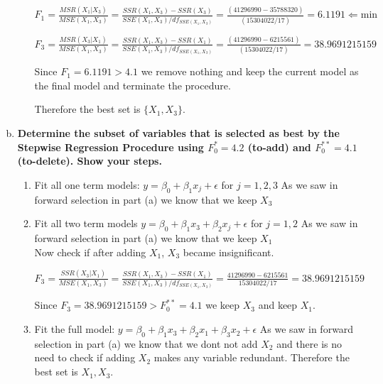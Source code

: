 \documentclass{article}
\begin{document}
\begin{enumerate}[(a)]
\begin{enumerate}[(1)]
$F_1 =
\frac{ MSR(X_1 | X_3)
}{
MSE(X_1, X_3)
}
=
\frac{
SSR(X_1, X_3) - SSR(X_3)
}{
SSE(X_1,X_3)/df_{SSE(X_1, X_3)}
}
= 
\frac{
(41 296 990 - 35 788 320)
}{
(15 304 022 / 17)
}
= 6.1191 \Leftarrow \text{min}
$

$F_3 =
\frac{ MSR(X_3 | X_1)
}{
MSE(X_1, X_3)
}
=
\frac{
SSR(X_1, X_3) - SSR(X_1)
}{
SSE(X_1,  X_3)/df_{SSE(X_1, X_3)}
}
= 
\frac{
(41 296 990 - 6 215 561 )
}{
(15 304 022 / 17)
}
= 38.9691215159
$

Since $F_1 = 6.1191 > 4.1$ we remove nothing and keep the current model as the final model and terminate the procedure.

Therefore the best set is $\{X_1, X_3\}$.

\end{enumerate}

\item \textbf{Determine the subset of variables that is selected as best by the Stepwise Regression
Procedure using $F_0^* = 4.2$ (to-add) and $F_0^{**} = 4.1$ (to-delete). Show your steps. }

\begin{enumerate}[(1)]
\item Fit all one term models: $y= \beta_0 + \beta_1x_j + \epsilon$ for $j = 1,2,3$
As we saw in forward selection in part (a) we know that we keep $X_3$

\item Fit all two term models $y = \beta_0 + \beta_1x_3 + \beta_2x_j + \epsilon$ for $j = 1,2$
As we saw in forward selection in part (a) we know that we keep $X_1$ \\

Now check if after adding $X_1$, $X_3$ became insignificant. 

$F_3 = \frac{ SSR(X_3 | X_1) }{ MSE(X_1, X_3)} = \frac{ SSR(X_1, X_3) - SSR(X_1)}{SSE(X_1, X_3)/df_{SSE(X_1, X_3)}} = \frac{41 296 990 - 6 215 561}{15 304 022/ 17} = 38.9691215159$

Since $F_3 = 38.9691215159 > F_0^{**} = 4.1$ we keep  $X_3$ and keep $X_1$. 

\item Fit the full model: $y = \beta_0 + \beta_1x_3 + \beta_2x_1 + \beta_3x_2 + \epsilon$
As we saw in forward selection in part (a) we know that we dont not add $X_2$ and there is no need to check if adding $X_2$ makes any variable redundant. Therefore the best set is ${X_1, X_3}$.

\end{enumerate}

\end{enumerate}
\end{document}
